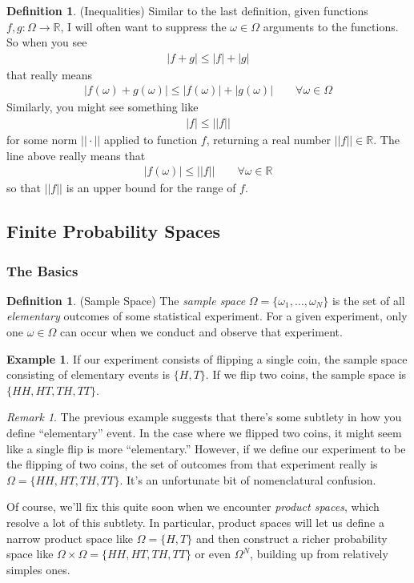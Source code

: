 \documentclass[12pt]{article}
\theoremstyle{plain}
\theoremstyle{definition}
\newtheorem{defn}[thm]{Definition}
\newtheorem{ex}[thm]{Example}
\theoremstyle{remark}
\newtheorem*{rmk}{Remark}
\newcommand{\ra}{\rightarrow}
\newcommand{\R}{\mathbb{R}}
\begin{document}
\begin{defn}(Inequalities)
Similar to the last definition, given functions
$f,g:\Omega \ra \R$, I will often want to suppress the $\omega\in\Omega$
arguments to the functions. So when you see
\begin{align*}
  |f+g|\leq |f| + |g|
\end{align*}
that really means
\begin{align*}
  |f(\omega)+g(\omega)|\leq |f(\omega)| + |g(\omega)|
  \qquad \forall\omega\in\Omega
\end{align*}
Similarly, you might see something like
\begin{align*}
  |f|\leq ||f||
\end{align*}
for some norm $||\cdot ||$ applied to function $f$, returning a real
number $||f||\in\R$. The line above really means that
\begin{align*}
  |f(\omega)| \leq ||f|| \qquad\forall \omega\in\R
\end{align*}
so that $||f||$ is an upper bound for the range of $f$.
\end{defn}



\subsection{Finite Probability Spaces}

\subsubsection{The Basics}

\begin{defn}{(Sample Space)}
The \emph{sample space} $\Omega=\{\omega_1,\ldots,\omega_N\}$ is the set
of all \emph{elementary} outcomes of some statistical experiment. For a
given experiment, only one $\omega \in \Omega$ can occur when we conduct
and observe that experiment.
\end{defn}
\begin{ex}
If our experiment consists of flipping a single coin, the sample space
consisting of elementary events is $\{H,T\}$. If we flip two coins, the
sample space is $\{HH,HT,TH,TT\}$.
\end{ex}
\begin{rmk}
The previous example suggests that there's some subtlety in how you
define ``elementary'' event. In the case where we flipped two coins, it
might seem like a single flip is more ``elementary.'' However, if we define
our experiment to be the flipping of two coins, the set of outcomes from
that experiment really is $\Omega=\{HH,HT,TH,TT\}$. It's an unfortunate
bit of nomenclatural confusion.

Of course, we'll fix this quite soon when we encounter \emph{product
spaces}, which resolve a lot of this subtlety. In particular, product
spaces will let us define a narrow product space like $\Omega=\{H,T\}$
and then construct a richer probability space like
$\Omega\times \Omega = \{HH,HT,TH,TT\}$ or even $\Omega^N$, building up
from relatively simples ones.
\end{rmk}
\end{document}
